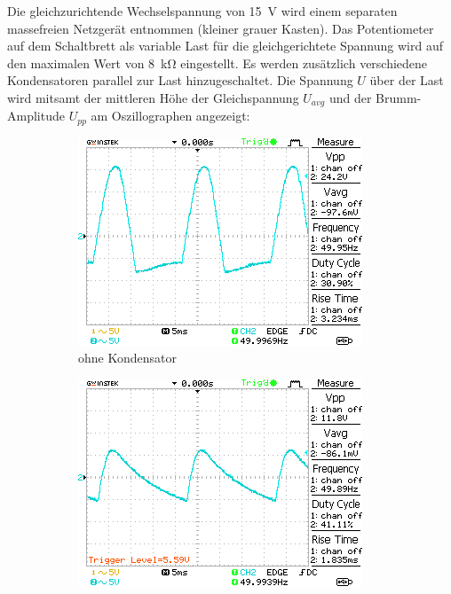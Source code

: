 Die gleichzurichtende Wechselspannung von \SI{15}{\volt} wird einem separaten massefreien Netzgerät entnommen (kleiner grauer Kasten). 
Das Potentiometer auf dem Schaltbrett als variable Last für die gleichgerichtete Spannung wird auf den maximalen Wert von \SI{8}{\kilo\ohm} eingestellt.
Es werden zusätzlich verschiedene Kondensatoren parallel zur Last hinzugeschaltet.
Die Spannung $U$ über der Last wird mitsamt der mittleren Höhe der Gleichspannung $U_{avg}$ und der Brumm-Amplitude $U_{pp}$ am Oszillographen angezeigt:

\begin{figure}[H]
    \centering
    \begin{subfigure}[b]{0.45\textwidth}
        \includegraphics[width=\textwidth]{figs/3/DS0009.png}
        \caption{ohne Kondensator}
        \label{fig:3_C0}
    \end{subfigure}
    \hfill
    \begin{subfigure}[b]{0.45\textwidth}
        \includegraphics[width=\textwidth]{figs/3/DS0010.png}

\end{subfigure}
\end{figure}
